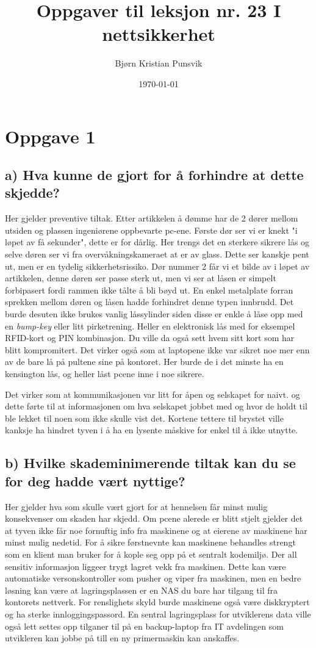 \documentclass[12pt,a4paper]{article}
\title{\vspace{-3cm}Oppgaver til leksjon nr. 23 I nettsikkerhet}
\author{Bjørn Kristian Punsvik}
\date{\today}
\begin{document}
\maketitle
\section*{Oppgave 1}
\subsection*{a) Hva kunne de gjort for å forhindre at dette skjedde?}
Her gjelder preventive tiltak. Etter artikkelen å dømme har de 2 dører mellom utsiden og plassen ingeniørene oppbevarte pc-ene. Første dør ser vi er knekt "i løpet av få sekunder", dette er for dårlig. Her trengs det en sterkere sikrere lås og selve døren ser vi fra overvåkningskameraet at er av glass. Dette ser kanskje pent ut, men er en tydelig sikkerhetsrissiko. Dør nummer 2 får vi et bilde av i løpet av artikkelen, denne døren ser passe sterk ut, men vi ser at låsen er simpelt forbipasert fordi rammen ikke tålte å bli bøyd ut. En enkel metalplate forran sprekken mellom døren og låsen hadde forhindret denne typen innbrudd. Det burde desuten ikke brukes vanlig låssylinder siden disse er enkle å låse opp med en \textit{bump-key} eller litt pirketrening. Heller en elektronisk lås med for eksempel RFID-kort og PIN kombinasjon. Du ville da også sett hvem sitt kort som har blitt kompromitert. Det virker også som at laptopene ikke var sikret noe mer enn av de bare lå på pultene sine på kontoret. Her burde de i det minste ha en kensington lås, og heller låst pcene inne i noe sikrere.

Det virker som at kommunikasjonen var litt for åpen og selskapet for naivt. og dette førte til at informasjonen om hva selskapet jobbet med og hvor de holdt til ble lekket til noen som ikke skulle vist det. Kortene tettere til brystet ville kanksje ha hindret tyven i å ha en lysente måskive for enkel til å ikke utnytte.


\subsection*{b) Hvilke skademinimerende tiltak kan du se for deg hadde vært nyttige?}
Her gjelder hva som skulle vært gjort for at hennelsen får minst mulig konsekvenser om skaden har skjedd. Om pcene alerede er blitt stjelt gjelder det at tyven ikke får noe fornuftig info fra maskinene og at eierene av maskinene har minst mulig nedetid. For å sikre førstnevnte kan maskinene behandles strengt som en klient man bruker for å kople seg opp på et sentralt kodemiljø. Der all sensitiv informasjon liggeer trygt lagret vekk fra maskinen. Dette kan være automatiske versonskontroller som pusher og viper fra maskinen, men en bedre løsning kan være at lagringsplassen er en NAS du bare har tilgang til fra kontorets nettverk. For renslighets skyld burde maskinene også være diskkryptert og ha sterke innloggingspassord. En sentral lagringsplass for utviklerens data ville også lett settes opp tilganer til på en backup-laptop fra IT avdelingen som utvikleren kan jobbe på till en ny primermaskin kan anskaffes.
\end{document}
